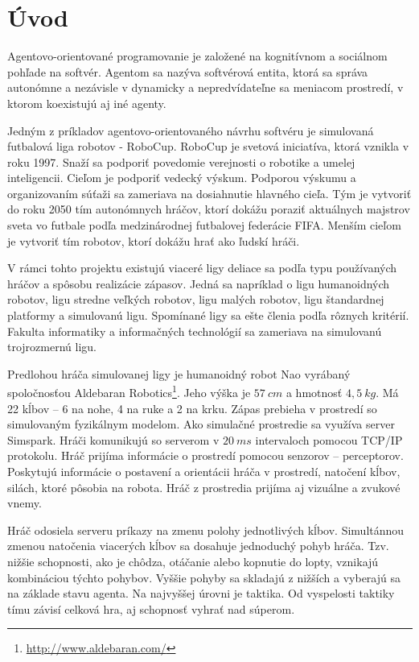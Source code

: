 \section{Úvod}

Agentovo-orientované programovanie \cite{shoham} je založené na kognitívnom a sociálnom pohľade na softvér. Agentom sa nazýva softvérová entita, ktorá sa správa autonómne a nezávisle v dynamicky a nepredvídateľne sa meniacom prostredí, v ktorom koexistujú aj iné agenty.

Jedným z príkladov agentovo-orientovaného návrhu softvéru je simulovaná futbalová liga robotov - RoboCup.
RoboCup \cite{robocup} je svetová iniciatíva, ktorá vznikla v roku 1997. Snaží sa podporiť povedomie verejnosti o robotike a umelej inteligencii. Cieľom je podporiť vedecký výskum. Podporou výskumu a organizovaním súťaži sa zameriava na dosiahnutie hlavného cieľa. Tým je vytvoriť do roku 2050 tím autonómnych hráčov, ktorí dokážu poraziť aktuálnych majstrov sveta vo futbale podľa medzinárodnej futbalovej federácie FIFA. Menším cieľom je vytvoriť tím robotov, ktorí dokážu hrať ako ľudskí hráči. 

V rámci tohto projektu existujú viaceré ligy deliace sa podľa typu používaných hráčov a spôsobu  realizácie  zápasov.  Jedná  sa  napríklad  o ligu  humanoidných  robotov,  ligu  stredne veľkých  robotov,  ligu  malých  robotov,  ligu  štandardnej  platformy  a  simulovanú  ligu. Spomínané  ligy  sa  ešte členia  podľa  rôznych  kritérií. Fakulta informatiky a informačných technológií sa zameriava na simulovanú trojrozmernú ligu. 

Predlohou hráča simulovanej ligy je humanoidný robot Nao vyrábaný spoločnosťou Aldebaran Robotics\footnote{\url{http://www.aldebaran.com/}}. Jeho výška je $57~cm$ a hmotnosť $4,5~kg$. Má 22 kĺbov – 6 na nohe, 4 na ruke a 2 na krku. Zápas prebieha v prostredí so simulovaným fyzikálnym modelom. Ako simulačné prostredie sa využíva server Simspark\cite{simspark}. Hráči komunikujú so serverom v $20~ms$ intervaloch pomocou TCP/IP protokolu. Hráč prijíma informácie o prostredí pomocou senzorov – perceptorov. Poskytujú informácie o postavení a orientácii hráča v prostredí, natočení kĺbov, silách, ktoré pôsobia na robota. Hráč z prostredia prijíma aj vizuálne a zvukové vnemy. 

Hráč  odosiela  serveru  príkazy  na  zmenu polohy  jednotlivých  kĺbov.  Simultánnou  zmenou  natočenia  viacerých  kĺbov  sa  dosahuje jednoduchý pohyb hráča. Tzv. nižšie schopnosti, ako je chôdza, otáčanie alebo kopnutie do lopty, vznikajú kombináciou týchto pohybov. Vyššie pohyby sa skladajú z nižších a vyberajú sa na základe stavu agenta. Na najvyššej úrovni je taktika. Od vyspelosti taktiky tímu závisí celková hra, aj schopnosť vyhrať nad súperom. 

